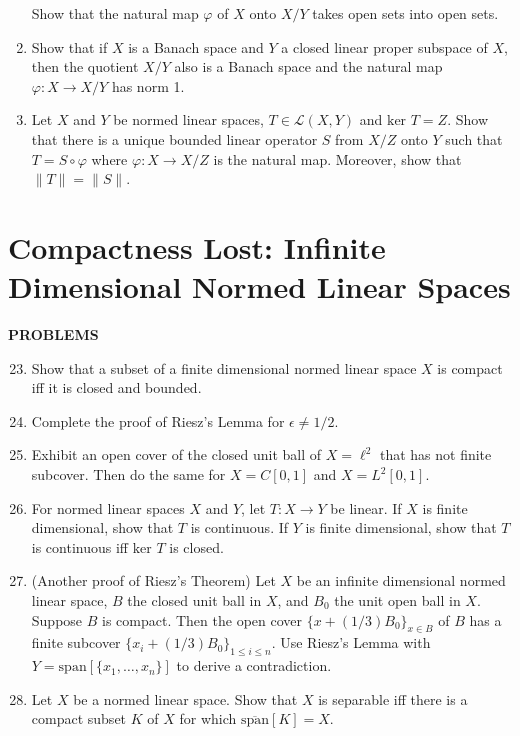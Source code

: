 \begin{enumerate}
    Show that the natural map $\varphi$ of $X$ onto $X/Y$ takes open sets into open sets.
    \item Show that if $X$ is a Banach space and $Y$ a closed linear proper subspace of $X$, then the quotient $X/Y$ also is a Banach space and the natural map $\varphi:X\to X/Y$ has norm 1.
    \item Let $X$ and $Y$ be normed linear spaces, $T\in\mathcal{L}(X,Y)$ and $\text{ker }T=Z$.
    Show that there is a unique bounded linear operator $S$ from $X/Z$ onto $Y$ such that $T=S\circ\varphi$ where $\varphi:X\to X/Z$ is the natural map.
    Moreover, show that $\|T\|=\|S\|$.
\end{enumerate}

\section{Compactness Lost: Infinite Dimensional Normed Linear Spaces}
\begin{center}
	\textbf{PROBLEMS}
\end{center}
\begin{enumerate}
	\setcounter{enumi}{22}
    \item Show that a subset of a finite dimensional normed linear space $X$ is compact iff it is closed and bounded.
    \item Complete the proof of Riesz's Lemma for $\epsilon\neq1/2$.
    \item Exhibit an open cover of the closed unit ball of $X=\ell^2$ that has not finite subcover.
    Then do the same for $X=C[0,1]$ and $X=L^2[0,1]$.
    \item For normed linear spaces $X$ and $Y$, let $T:X\to Y$ be linear.
    If $X$ is finite dimensional, show that $T$ is continuous. 
    If $Y$ is finite dimensional, show that $T$ is continuous iff $\text{ker }T$ is closed.
    \item (Another proof of Riesz's Theorem) Let $X$ be an infinite dimensional normed linear space, $B$ the closed unit ball in $X$, and $B_0$ the unit open ball in $X$.
    Suppose $B$ is compact.
    Then the open cover $\{x+(1/3)B_0\}_{x\in B}$ of $B$ has a finite subcover $\{x_i+(1/3)B_0\}_{1\le i\le n}$.
    Use Riesz's Lemma with $Y=\text{span}[\{x_1,\dots,x_n\}]$ to derive a contradiction.
    \item Let $X$ be a normed linear space.
    Show that $X$ is separable iff there is a compact subset $K$ of $X$ for which $\overline{\text{span}}[K]=X$.
\end{enumerate}

